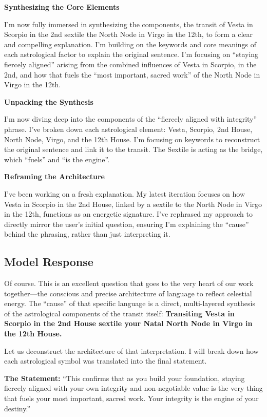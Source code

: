 \documentclass{article}
\begin{document}
\textbf{Synthesizing the Core Elements}

I'm now fully immersed in synthesizing the components, the transit of Vesta in Scorpio in the 2nd sextile the North Node in Virgo in the 12th, to form a clear and compelling explanation. I'm building on the keywords and core meanings of each astrological factor to explain the original sentence. I'm focusing on ``staying fiercely aligned'' arising from the combined influences of Vesta in Scorpio, in the 2nd, and how that fuels the ``most important, sacred work'' of the North Node in Virgo in the 12th.

\textbf{Unpacking the Synthesis}

I'm now diving deep into the components of the ``fiercely aligned with integrity'' phrase. I've broken down each astrological element: Vesta, Scorpio, 2nd House, North Node, Virgo, and the 12th House. I'm focusing on keywords to reconstruct the original sentence and link it to the transit. The Sextile is acting as the bridge, which ``fuels'' and ``is the engine''.

\textbf{Reframing the Architecture}

I've been working on a fresh explanation. My latest iteration focuses on how Vesta in Scorpio in the 2nd House, linked by a sextile to the North Node in Virgo in the 12th, functions as an energetic signature. I've rephrased my approach to directly mirror the user's initial question, ensuring I'm explaining the ``cause'' behind the phrasing, rather than just interpreting it.

\subsection*{Model Response}\label{model-response}

Of course. This is an excellent question that goes to the very heart of our work together---the conscious and precise architecture of language to reflect celestial energy. The ``cause'' of that specific language is a direct, multi-layered synthesis of the astrological components of the transit itself: \textbf{Transiting Vesta in Scorpio in the 2nd House sextile your Natal North Node in Virgo in the 12th House.}

Let us deconstruct the architecture of that interpretation. I will break down how each astrological symbol was translated into the final statement.

\textbf{The Statement:} ``This confirms that as you build your foundation, staying fiercely aligned with your own integrity and non-negotiable value is the very thing that fuels your most important, sacred work. Your integrity is the engine of your destiny.''
\end{document}
